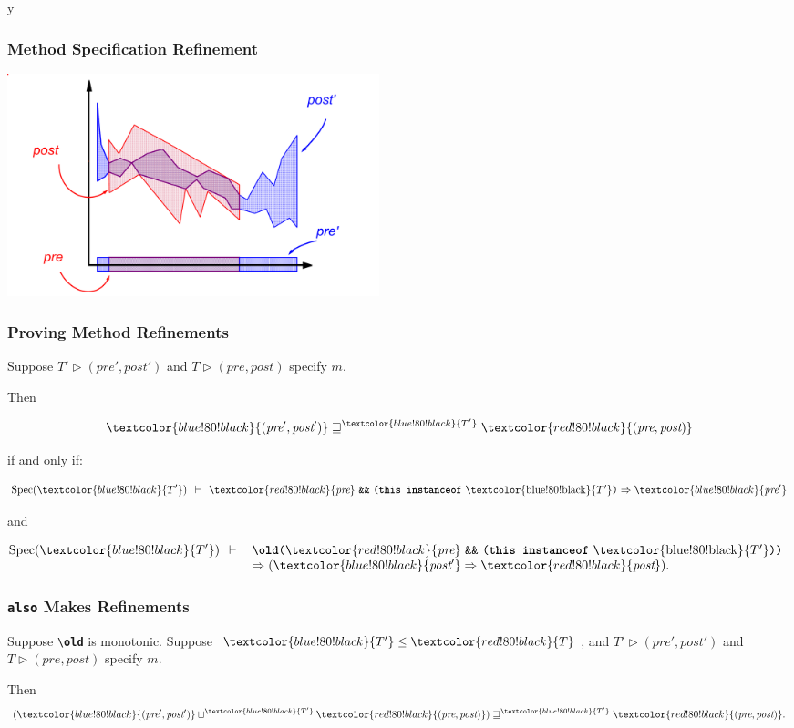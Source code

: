 \if y\MAKEHANDOUTS \documentclass[t,compress,landscape,handout]{beamer}
\newcommand{\JMLKW}[1]{\textcolor{violet!80!black}{\textbf{\texttt{#1}}}}
\newcommand{\STO}{\ensuremath{\leq}}
\newcommand{\RED}[1]{\textcolor{red!80!black}{#1}}
\newcommand{\BLUE}[1]{\textcolor{blue!80!black}{#1}}
\newcommand{\REDT}{\RED{\ensuremath{T}}}
\newcommand{\BLUETP}{\BLUE{\ensuremath{T'}}}
\newcommand{\pre}{{\textit{pre}}}
\newcommand{\post}{{\textit{post}}}
\newcommand{\join}{\ensuremath{\sqcup}}
\newcommand{\refines}{\ensuremath{\sqsupseteq}}
\newcommand{\At}{\triangleright}
\newcommand{\Spec}[1]{\textrm{Spec}(#1)}
\newcommand{\Proves}{\:\: \vdash \:\:}
\begin{document}
\begin{frame}
\frametitle{Method Specification Refinement}
\transdissolve[duration=0.2]
\includegraphics[width=4.25in]{meth-refine3}
\end{frame}

\begin{frame}
\frametitle{Proving Method Refinements}
\begin{theorem}
\label{th:refinement}
Suppose \BLUE{$T' \At (\pre',\post')$} and \RED{$T \At (\pre,\post)$}
specify $m$.

Then 

\begin{displaymath}
\BLUE{(\pre',\post')} \refines^{\BLUETP} \RED{(\pre,\post)}
\end{displaymath}

if and only if:

\begin{displaymath}
\Spec{{\BLUETP}} \Proves
 \RED{\pre} \mbox{ \texttt{\&\&} }
          \mbox{\texttt{(}\textbf{\texttt{this instanceof}} \BLUETP\texttt{)}}
 \Rightarrow \BLUE{\pre'}
\end{displaymath}

and

\begin{displaymath}
\Spec{{\BLUETP}} \Proves
\begin{array}[t]{l}
\mbox{\texttt{{\textbackslash}\textbf{old}(}}\RED{\pre}
   \mbox{ \texttt{\&\&} }
   \mbox{\texttt{(}\textbf{\texttt{this instanceof}} \BLUETP\texttt{))}} \\
   \Rightarrow (\BLUE{\post'} \Rightarrow \RED{\post}).
\end{array}
\end{displaymath}
\end{theorem}
\end{frame}

\begin{frame}
\frametitle{\JMLKW{also} Makes Refinements}

\begin{theorem}
Suppose \mbox{\texttt{{\textbackslash}\textbf{old}}}
is monotonic.
Suppose $\BLUETP \STO \REDT$, and
\BLUE{$T' \At (\pre',\post')$} and \RED{$T \At (\pre,\post)$}
specify $m$.

Then 
\begin{displaymath}
(\BLUE{(\pre',\post')} \join^{\BLUETP} \RED{(\pre,\post)}) 
  \refines^{\BLUETP} \RED{(\pre,\post)}.
\end{displaymath}
\end{theorem}
\end{frame}
\end{document}
